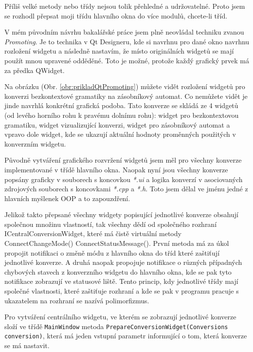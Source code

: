 Příliš velké metody nebo třídy nejsou tolik přehledné a udržovatelné. Proto jsem se rozhodl přepsat moji třídu hlavního okna do více modulů, chcete-li tříd.

V mém původním návrhu bakalářské práce jsem plně neovládal techniku zvanou \textit{Promoting}. Je to technika v Qt Designeru, kde si navrhnu pro dané okno navrhnu rozložení widgetu a následně nastavím, že místo originálních widgetů se mají použít mnou upravené odděděné. Toto je možné, protože každý grafický prvek má za předka QWidget.


Na obrázku (Obr. \ref{obr:prikladQtPromoting}) můžete vidět rozložení widgetů pro konverzi bezkontextové gramatiky na zásobníkový automat. Co nemůžete vidět je jinde navrhlá konkrétní grafická podoba. Tato konverze se skládá ze 4 widgetů (od levého horního rohu k pravému dolnímu rohu): widget pro bezkontextovou gramatiku, widget vizualizující konverzi, widget pro zásobníkový automat a vpravo dole widget, kde se ukazují aktuální hodnoty proměnných použitých v konverzním widgetu.

Původně vytváření grafického rozvržení widgetů jsem měl pro všechny konverze implementované v třídě hlavního okna. Naopak nyní jsou všechny konverze popsány graficky v souborech s koncovkou \textit{*.ui} a logika konverzí v asociovaných zdrojových souborech s koncovkami \textit{*.cpp} a \textit{*.h}. Toto jsem dělal ve jménu jedné z hlavních myšlenek OOP a to zapouzdření.

Jelikož takto přepsané všechny widgety popisující jednotlivé konverze obsahují společnou množinu vlastností, tak všechny dědí od společného rozhraní ICentralConversionWidget, které má čistě virtuální metody ConnectChangeMode() ConnectStatusMessage(). První metoda má za úkol propojit notifikaci o změně módu z hlavního okna do tříd které zaštiťují jednotlivé konverze. A druhá naopak propojuje notifikace o různých případných chybových stavech z konverzního widgetu do hlavního okna, kde se pak tyto notifikace zobrazují ve statusové liště. Tento princip, kdy jednotlivé třídy mají společné vlastnosti, které zaštiťuje rozhraní a kde se pak v programu pracuje s ukazatelem na rozhraní se nazívá polimorfizmus.

Pro vytváření centrálního widgetu, ve kterém se zobrazují jednotlivé konverze složí ve třídě \texttt{MainWindow} metoda \texttt{PrepareConversionWidget(Conversions conversion)}, která má jeden vstupní parametr informující o tom, která konverze se má nastavit.

